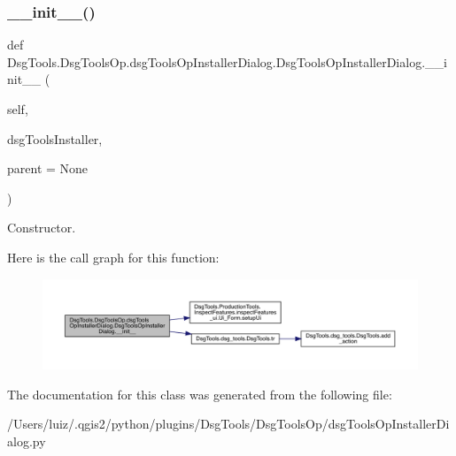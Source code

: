 \subsubsection{\texorpdfstring{\+\_\+\+\_\+init\+\_\+\+\_\+()}{\_\_init\_\_()}}
{\footnotesize\ttfamily def Dsg\+Tools.\+Dsg\+Tools\+Op.\+dsg\+Tools\+Op\+Installer\+Dialog.\+Dsg\+Tools\+Op\+Installer\+Dialog.\+\_\+\+\_\+init\+\_\+\+\_\+ (\begin{DoxyParamCaption}\item[{}]{self,  }\item[{}]{dsg\+Tools\+Installer,  }\item[{}]{parent = {\ttfamily None} }\end{DoxyParamCaption})}

\begin{DoxyVerb}Constructor.\end{DoxyVerb}
 Here is the call graph for this function\+:
\nopagebreak
\begin{figure}[H]
\begin{center}
\leavevmode
\includegraphics[width=350pt]{class_dsg_tools_1_1_dsg_tools_op_1_1dsg_tools_op_installer_dialog_1_1_dsg_tools_op_installer_dialog_a13f07563445abc91d69982eb73d85a28_cgraph}
\end{center}
\end{figure}


The documentation for this class was generated from the following file\+:\begin{DoxyCompactItemize}
\item 
/\+Users/luiz/.\+qgis2/python/plugins/\+Dsg\+Tools/\+Dsg\+Tools\+Op/dsg\+Tools\+Op\+Installer\+Dialog.\+py\end{DoxyCompactItemize}
